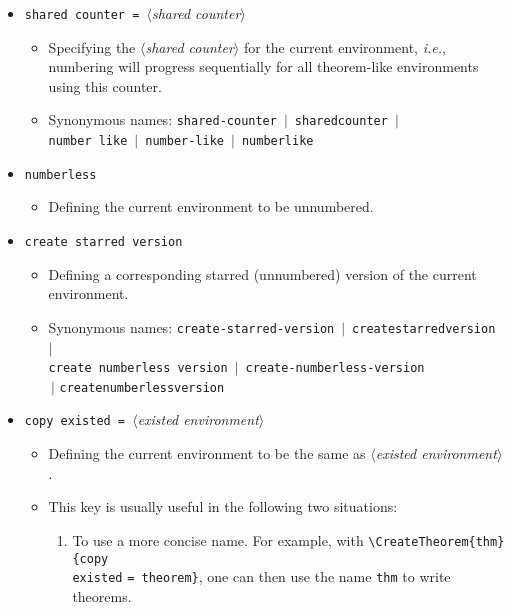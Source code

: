 \documentclass[classical]{einfart}
\newcommand{\meta}[1]{$\langle${\normalfont\itshape#1}$\rangle$}
\newcommand{\commandoption}[1]{\texttt{\textcolor{code-keys}{#1}}}
\begin{document}
\begin{itemize}[label=,leftmargin=1.25em,itemindent=-1.25em]
\begin{itemize}
        \end{itemize}
    \item \commandoption{shared counter}\lstinline| = |\meta{shared counter}
        \begin{itemize}
            \item Specifying the \meta{shared counter} for the current environment, \emph{i.e.}, numbering will progress sequentially for all theorem-like environments using this counter.
            \item Synonymous names: \commandoption{shared-counter} \,$|$\, \commandoption{sharedcounter} \,$|$\, \\\phantom{Synonymous names: }\commandoption{number like} \,$|$\, \commandoption{number-like} \,$|$\, \commandoption{numberlike}
        \end{itemize}
    \item \commandoption{numberless}
        \begin{itemize}
            \item Defining the current environment to be unnumbered.
        \end{itemize}
    \item \commandoption{create starred version}
        \begin{itemize}
            \item Defining a corresponding starred (unnumbered) version of the current environment.
            \item Synonymous names: \commandoption{create-starred-version} \,$|$\, \commandoption{createstarredversion} \,$|$\, \\\phantom{Synonymous names: }\commandoption{create numberless version} \,$|$\, \commandoption{create-numberless-version} \\\phantom{Synonymous names: }\,$|$ \commandoption{createnumberlessversion}
        \end{itemize}
    \item \commandoption{copy existed}\lstinline| = |\meta{existed environment}
        \begin{itemize}
            \item Defining the current environment to be the same as \meta{existed environment}.
            \item This key is usually useful in the following two situations:
                \begin{enumerate}
                    \item To use a more concise name. For example, with \lstinline|\CreateTheorem{thm}{|\commandoption{copy \\existed} \lstinline|= theorem}|, one can then use the name \texttt{thm} to write theorems.

\end{enumerate}
\end{itemize}
\end{itemize}
\end{document}
